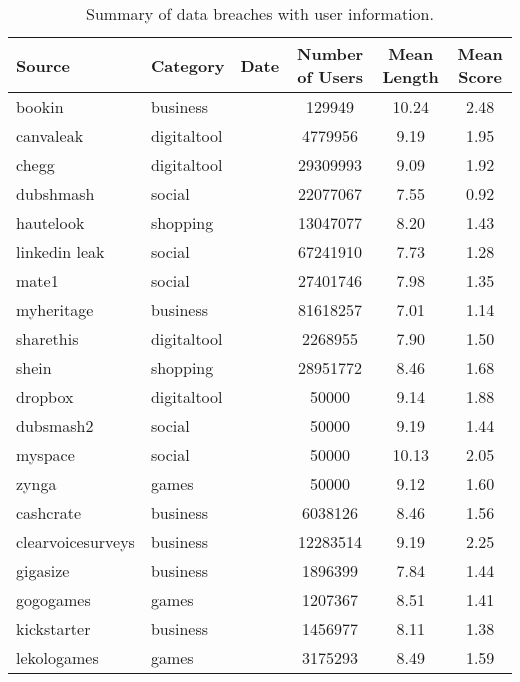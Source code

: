\begin{table*}[h!]
\centering
\begin{tabular}{|l|l|c|c|c|c|}
\hline
\textbf{Source} & \textbf{Category} & \textbf{Date} & \textbf{Number of Users} & \textbf{Mean Length} & \textbf{Mean Score} \\
\hline
bookin & business &  & 129949 & 10.24 & 2.48 \\
canvaleak & digitaltool &  & 4779956 & 9.19 & 1.95 \\
chegg & digitaltool &  & 29309993 & 9.09 & 1.92 \\
dubshmash & social &  & 22077067 & 7.55 & 0.92 \\
hautelook & shopping &  & 13047077 & 8.20 & 1.43 \\
linkedin leak & social &  & 67241910 & 7.73 & 1.28 \\
mate1 & social &  & 27401746 & 7.98 & 1.35 \\
myheritage & business &  & 81618257 & 7.01 & 1.14 \\
sharethis & digitaltool &  & 2268955 & 7.90 & 1.50 \\
shein & shopping &  & 28951772 & 8.46 & 1.68 \\
dropbox & digitaltool &  & 50000 & 9.14 & 1.88 \\
dubsmash2 & social &  & 50000 & 9.19 & 1.44 \\
myspace & social &  & 50000 & 10.13 & 2.05 \\
zynga & games &  & 50000 & 9.12 & 1.60 \\
cashcrate & business &  & 6038126 & 8.46 & 1.56 \\
clearvoicesurveys & business &  & 12283514 & 9.19 & 2.25 \\
gigasize & business &  & 1896399 & 7.84 & 1.44 \\
gogogames & games &  & 1207367 & 8.51 & 1.41 \\
kickstarter & business &  & 1456977 & 8.11 & 1.38 \\
lekologames & games &  & 3175293 & 8.49 & 1.59 \\
\hline
\end{tabular}
\caption{Summary of data breaches with user information.}
\end{table*}
